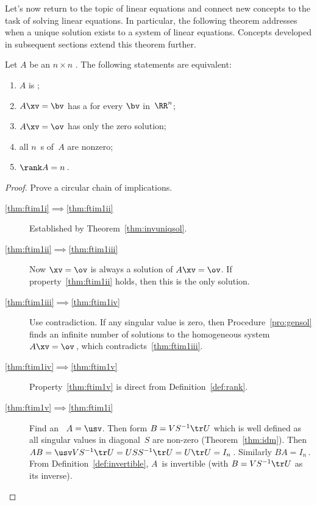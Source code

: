 

Let's now return to the topic of linear equations and connect new concepts to the task of solving linear equations.
In particular, the following theorem addresses when a unique solution exists to a system of linear equations.
Concepts developed in subsequent sections extend this theorem further.


\begin{theorem} \label{thm:ftim1} 
Let \(A\) be an \(n\times n\) .  The following statements are equivalent: 
\begin{enumerate}
\item\label{thm:ftim1i} \(A\) is ;
\item\label{thm:ftim1ii} \(A\xv=\bv\) has a  for every \(\bv\) in~\(\RR^n\);
\item\label{thm:ftim1iii} \(A\xv=\ov\) has only the zero solution;
\item\label{thm:ftim1iv} all \(n\)~s of~\(A\) are nonzero;
\item\label{thm:ftim1v} \(\rank A=n\)\,.
\end{enumerate}
\end{theorem}

\begin{proof} 
Prove a circular chain of implications. 
\begin{description}
\item[\ref{thm:ftim1i}$\implies$\ref{thm:ftim1ii}]
Established by Theorem~\ref{thm:invuniqsol}.
\item[\ref{thm:ftim1ii}$\implies$\ref{thm:ftim1iii}]
Now \(\xv=\ov\) is always a solution of \(A\xv=\ov\).  If property~\ref{thm:ftim1ii} holds, then this is the only solution.
\item[\ref{thm:ftim1iii}$\implies$\ref{thm:ftim1iv}]
Use contradiction.  
If any singular value is zero, then Procedure~\ref{pro:gensol} finds an infinite number of solutions to the homogeneous system \(A\xv=\ov\)\,, which contradicts~\ref{thm:ftim1iii}.
\item[\ref{thm:ftim1iv}$\implies$\ref{thm:ftim1v}]
Property~\ref{thm:ftim1v} is direct from Definition~\ref{def:rank}.
\item[\ref{thm:ftim1v}$\implies$\ref{thm:ftim1i}]
Find an \svd\ \(A=\usv\).  
Then form \(B=VS^{-1}\tr U\) which is well defined as all singular values in diagonal~\(S\) are non-zero (Theorem~\ref{thm:idm}).
Then \(AB=\usv VS^{-1}\tr U=USS^{-1}\tr U=U\tr U=I_n\)\,.  Similarly \(BA=I_n\)\,.  
From Definition~\ref{def:invertible}, \(A\)~is invertible (with \(B=VS^{-1}\tr U\) as its inverse).
\end{description}
\end{proof}



